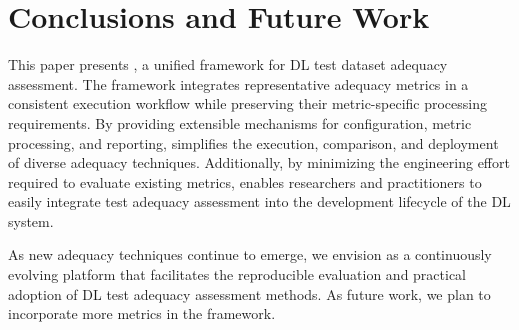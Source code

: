 \section{Conclusions and Future Work}
This paper presents \tool, a unified framework for DL test dataset adequacy assessment.
The framework integrates representative adequacy metrics in a consistent execution workflow while preserving their metric-specific processing requirements.
By providing extensible mechanisms for configuration, metric processing, and reporting, \tool simplifies the execution, comparison, and deployment of diverse adequacy techniques.
Additionally, by minimizing the engineering effort required to evaluate existing metrics, \tool enables researchers and practitioners to easily integrate test adequacy assessment into the development lifecycle of the DL system.


As new adequacy techniques continue to emerge, we envision \tool as a continuously evolving platform that facilitates the reproducible evaluation and practical adoption of DL test adequacy assessment methods.
As future work, we plan to incorporate more metrics in the framework.
